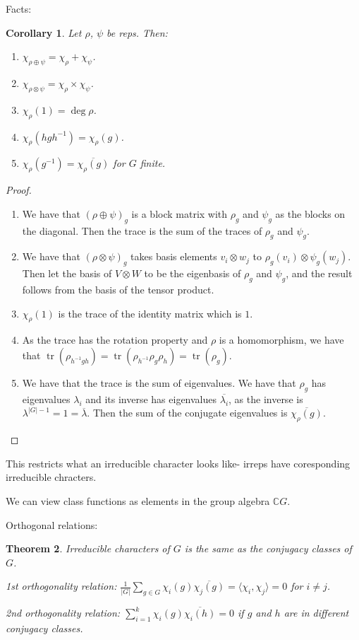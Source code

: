 \documentclass[]{report}
\newtheorem{theorem}{Theorem}
\newtheorem{corollary}[theorem]{Corollary}
\theoremstyle{definition}
\numberwithin{theorem}{section}
\numberwithin{equation}{section}
\newcommand{\tr}{\operatorname{tr}}
\begin{document}
Facts:
\begin{corollary}
	Let $\rho$, $\psi$ be reps. Then:
	\begin{enumerate}
		\item $\chi_{\rho \oplus \psi} = \chi_\rho + \chi_\psi$.
		\item $\chi_{\rho \otimes \psi} = \chi_\rho \times \chi_\psi$. 
		\item $\chi_\rho(1) = \deg \rho$. 
		\item $\chi_\rho(h g h^{-1}) = \chi_\rho(g)$.
		\item $\chi_\rho(g^{-1}) = \overline{\chi_\rho(g)}$ for $G$ finite. 
	\end{enumerate}
\end{corollary}
\begin{proof}
	\begin{enumerate}
		\item We have that $(\rho \oplus \psi)_g$ is a block matrix with $\rho_g$ and $\psi_g$ as the blocks on the diagonal. Then the trace is the sum of the traces of $\rho_g$ and $\psi_g$. 
		\item We have that $(\rho \otimes \psi)_g$ takes basis elements $v_i \otimes w_j$ to $\rho_g(v_i) \otimes \psi_g(w_j)$. Then let the basis of $V \otimes W$ to be the eigenbasis of $\rho_g$ and $\psi_g$, and the result follows from the basis of the tensor product.
		\item $\chi_\rho(1)$ is the trace of the identity matrix which is $1$. 
		\item As the trace has the rotation property and $\rho$ is a homomorphism, we have that $\tr(\rho_{h^{-1} g h}) = \tr(\rho_{h^{-1}} \rho_g \rho_h) = \tr( \rho_g)$. 
		\item We have that the trace is the sum of eigenvalues. We have that $\rho_g$ has eigenvalues $\lambda_i$ and its inverse has eigenvalues $\overline{\lambda_i}$, as the inverse is $\lambda^{|G| - 1} = 1 = \overline{\lambda}$. Then the sum of the conjugate eigenvalues is $\overline{\chi_\rho(g)}$. 
	\end{enumerate}
\end{proof}
This restricts what an irreducible character looks like- irreps have coresponding irreducible chracters. 

We can view class functions as elements in the group algebra $\mathbb{C}G$.

Orthogonal relations:
\begin{theorem}
	Irreducible characters of $G$ is the same as the conjugacy classes of $G$. 
	
	1st orthogonality relation:
	$\frac{1}{|G|} \sum_{g \in G} \chi_i(g) \overline{\chi_j(g)} = \langle \chi_i, \chi_j \rangle = 0$ for $i \neq j$.
	
	2nd orthogonality relation:
	$\sum_{i = 1}^{k} \chi_i(g) \overline{\chi_i(h)} = 0$ if $g$ and $h$ are in different conjugacy classes. 
\end{theorem}
\end{document}

